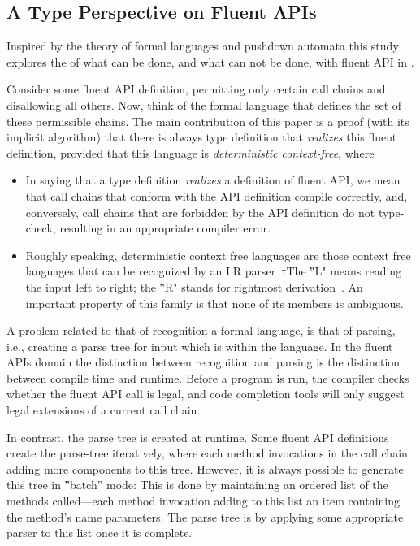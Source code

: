 \subsection{A Type Perspective on Fluent APIs}
Inspired by the theory of formal languages and pushdown automata
this study explores the of what can be done, and what can not be done, with fluent API in \Java.

Consider some fluent API definition, permitting only certain call
chains and disallowing all others.
Now, think of the formal language that defines the set of these permissible chains.
The main contribution of this paper is a proof (with its implicit algorithm) that
there is always \Java type definition that \emph{realizes} this fluent definition, provided that this
language is \emph{deterministic context-free}, where
\begin{itemize}
  \item In saying that a type definition \emph{realizes} a definition of fluent
    API, we mean that call chains that conform with the API definition compile
    correctly, and, conversely, call chains that are forbidden by the API
    definition do not type-check, resulting in an appropriate compiler error.
  \item Roughly speaking, deterministic context free languages are those
    context free languages that can be recognized by an LR parser~†{The ‟L"
    means reading the input left to right; the ‟R" stands for rightmost derivation}~\cite{Aho:86}.
    An important property of this family is that none of its members is ambiguous.
\end{itemize}

A problem related to that of recognition a formal language,
  is that of parsing, i.e., creating a parse tree for input which is within the language.
In the fluent APIs domain the distinction between recognition and parsing is
  the distinction between compile time and runtime.
Before a program is run, the compiler checks whether the fluent API call is legal,
  and code completion tools will only suggest legal extensions of a current call chain.

In contrast, the parse tree is created at runtime.
Some fluent API definitions create the parse-tree
  iteratively, where each method invocations in the call chain adding
  more components to this tree.
However, it is always possible to generate this tree in ‟batch” mode:
This is done by maintaining an ordered list of the methods
  called---each method invocation adding to this list an item containing the method's name
  parameters.
The parse tree is by applying some appropriate parser to this list
  once it is complete.

